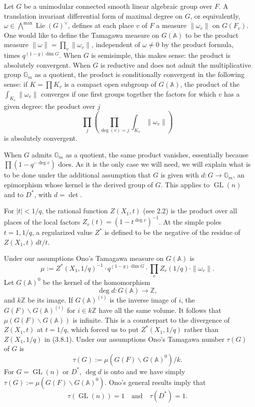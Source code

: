\documentclass[10pt]{article}
\newcommand{\Z}{\mathbb Z}
\newcommand{\Adele}{\mathbb A}
\newcommand{\Gm}{\mathbb G_m}
\newcommand{\GL}{\operatorname{GL}}
\newcommand{\Lie}{\operatorname{Lie}}
\newcommand{\degm}{\operatorname{deg}}
\newcommand{\detm}{\operatorname{det}}
\theoremstyle{deligne}
\begin{document}
Let $G$ be a unimodular connected smooth linear algebraic group over $F$. A translation invariant differential form of maximal degree on $G$, or equivalently, $\omega\in\bigwedge^{\max}\Lie(G)^\vee$, defines at each place $v$ of $F$ a measure $\|\omega_v\|$ on $G(F_v)$. One would like to define the Tamagawa measure on $G(\Adele)$ to be the product measure $\|\omega\|=\prod_v\|\omega_v\|$, independent of $\omega\ne0$ by the product formula, times $q^{(1-g)\dim G}$. When $G$ is semisimple, this makes sense: the product is absolutely convergent. When $G$ is reductive and does not admit the multiplicative group $\Gm$ as a quotient, the product is conditionally convergent in the following sense: if $K=\prod K_v$ is a compact open subgroup of $G(\Adele)$, the product of the $\int_{K_v}\|\omega_v\|$ converges if one first groups together the factors for which $v$ has a given degree: the product over $j$
\[
\prod_j\left(\prod_{\degm(v)=j}\int_{K_v}\|\omega_v\|\right)
\]
is absolutely convergent.

When $G$ admits $\Gm$ as a quotient, the same product vanishes, essentially because $\prod(1-q^{-\degm v})$ does. As it is the only case we will need, we will explain what is to be done under the additional assumption that $G$ is given with $d:G\to\Gm$, an epimorphism whose kernel is the derived group of $G$. This applies to $\GL(n)$ and to $D^*$, with $d=\detm$.

For $|t|<1/q$, the rational function $Z(X_1,t)$ (see 2.2) is the product over all places of the local factors $Z_v(t)=(1-t^{\degm v})^{-1}$. At the simple poles $t=1,1/q$, a regularized value $Z^*$ is defined to be the negative of the residue of $Z(X_1,t)\,dt/t$.

Under our assumptions Ono's Tamagawa measure on $G(\Adele)$ is
\begin{equation}\tag{3.8.1}
\mu:=Z^*(X_1,1/q)^{-1}\cdot q^{(1-g)\dim G}\cdot\prod_v Z_v(1/q)\cdot\|\omega_v\|.
\end{equation}
Let $G(\Adele)^0$ be the kernel of the homomorphism
\[
\degm d:G(\Adele)\longrightarrow\Z,
\]
and $k\Z$ be its image. If $G(\Adele)^{(i)}$ is the inverse image of $i$, the $G(F)\backslash G(\Adele)^{(i)}$ for $i\in k\Z$ have all the same volume. It follows that $\mu(G(F)\backslash G(\Adele))$ is infinite. This is a counterpart to the divergence of $Z(X_1,t)$ at $t=1/q$, which forced us to put $Z^*(X_1,1/q)$ rather than $Z(X_1,1/q)$ in (3.8.1). Under our assumptions Ono's Tamagawa number $\tau(G)$ of $G$ is
\begin{equation}\tag{3.8.2}
\tau(G):=\mu(G(F)\backslash G(\Adele)^0)/k.
\end{equation}
For $G=\GL(n)$ or $D^*$, $\degm d$ is onto and we have simply $\tau(G):=\mu(G(F)\backslash G(\Adele)^0)$. Ono's general results imply that
\begin{equation}\tag{3.8.3}
\tau(\GL(n))=1\quad\text{and}\quad \tau(D^*)=1.
\end{equation}
\end{document}
